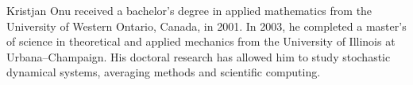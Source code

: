 
Kristjan Onu received a bachelor's degree in applied mathematics from the University of Western Ontario, Canada, in 2001. In 2003, he completed a master's of science in theoretical and applied mechanics from the University of Illinois at Urbana--Champaign. His doctoral research has allowed him to study stochastic dynamical systems, averaging methods and scientific computing.
